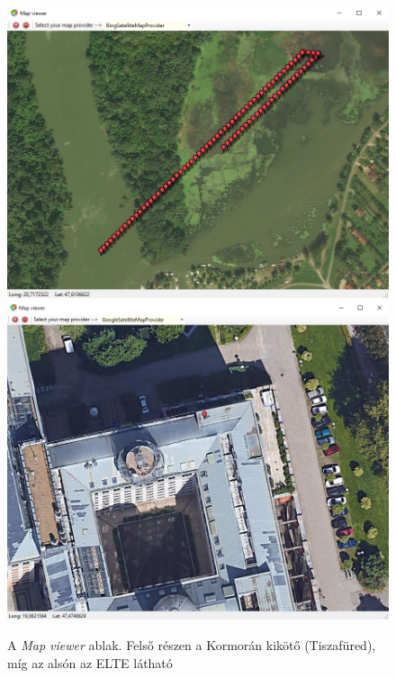 \documentclass[a4paper,12pt]{article}
\begin{document}
\begin{figure}
	\centering
	\includegraphics[width=12cm]{mapviewer.png}
	\includegraphics[width=12cm]{tegeta.png}		
	\caption{A \textit{Map viewer} ablak. Felső részen a Kormorán kikötő (Tiszafüred), míg az alsón az ELTE látható}
	\label{fig:mapviewer}
\end{figure}
\end{document}
